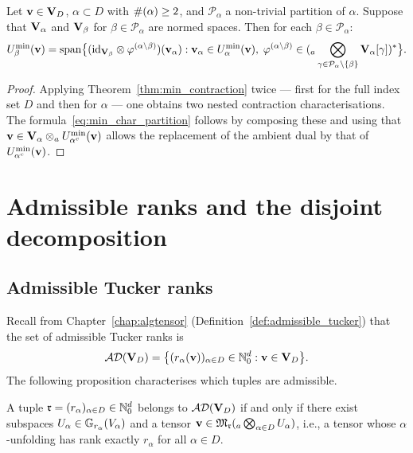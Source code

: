 \begin{proposition}
\label{prop:min_char_partition}
Let $\mathbf{v} \in \mathbf{V}_D$, $\alpha \subset D$ with $\#(\alpha) \geq 2$,
and $\mathcal{P}_\alpha$ a non-trivial partition of $\alpha$. Suppose
that $\mathbf{V}_\alpha$ and $\mathbf{V}_\beta$ for $\beta \in \mathcal{P}_\alpha$
are normed spaces. Then for each $\beta \in \mathcal{P}_\alpha$:
\begin{equation}
\label{eq:min_char_partition}
    U^{\min}_{\beta}(\mathbf{v})
    = \mathrm{span}\bigl\{
        (\mathrm{id}_{\mathbf{V}_\beta} \otimes \varphi^{(\alpha\setminus\beta)})
        (\mathbf{v}_\alpha) :
        \mathbf{v}_\alpha \in U^{\min}_{\alpha}(\mathbf{v}),\;
        \varphi^{(\alpha\setminus\beta)} \in
        ({}_a\bigotimes_{\gamma \in \mathcal{P}_\alpha \setminus \{\beta\}}
        \mathbf{V}_\alpha[\gamma])^*
    \bigr\}.
\end{equation}
\end{proposition}

\begin{proof}
Applying Theorem~\ref{thm:min_contraction} twice — first for the
full index set $D$ and then for $\alpha$ — one obtains two nested
contraction characterisations. The formula~\eqref{eq:min_char_partition}
follows by composing these and using that $\mathbf{v} \in \mathbf{V}_\alpha \otimes_a
U^{\min}_{\alpha^c}(\mathbf{v})$ allows the replacement of the ambient dual by that
of $U^{\min}_{\alpha^c}(\mathbf{v})$.
\end{proof}

\section{Admissible ranks and the disjoint decomposition}
\label{sec:min:admissible}

\subsection*{Admissible Tucker ranks}

Recall from Chapter~\ref{chap:algtensor} (Definition~\ref{def:admissible_tucker})
that the set of admissible Tucker ranks is
\begin{equation*}
    \mathcal{AD}(\mathbf{V}_D) = \bigl\{
        (r_\alpha(\mathbf{v}))_{\alpha \in D} \in \mathbb{N}_0^d : \mathbf{v} \in \mathbf{V}_D
    \bigr\}.
\end{equation*}
The following proposition characterises which tuples are admissible.

\begin{proposition}
\label{prop:admissible_characterisation}
A tuple $\mathfrak{r} = (r_\alpha)_{\alpha \in D} \in \mathbb{N}_0^d$ belongs to
$\mathcal{AD}(\mathbf{V}_D)$ if and only if there exist subspaces
$U_\alpha \in \mathbb{G}_{r_\alpha}(V_\alpha)$ and a tensor
$\mathbf{v} \in \mathfrak{M}_{\mathfrak{r}}({}_a\bigotimes_{\alpha \in D} U_\alpha)$,
i.e., a tensor whose $\alpha$-unfolding has rank exactly $r_\alpha$
for all $\alpha \in D$.
\end{proposition}

